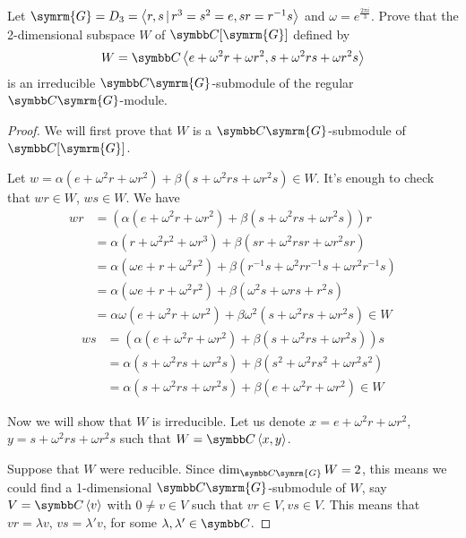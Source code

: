 \begin{exercise}
Let \(\symrm{G} = D_3 = \generatedby{r, s \vbar r^3 = s^2 = e, s r = r^{-1} s}\) and \(\omega = e^{\frac{2 \pi i}{3}}\). Prove that the 2-dimensional subspace \(W\) of \(\complex[\symrm{G}]\) defined by
\[
    W = \complex\generatedby{e + \omega^2 r + \omega r^2, s + \omega^2 r s + \omega r^2 s}
\]
is an irreducible \(\complex \symrm{G}\)-submodule of the regular \(\complex \symrm{G}\)-module.
\end{exercise}
\begin{proof}
We will first prove that \(W\) is a \(\complex \symrm{G}\)-submodule of \(\complex[\symrm{G}]\).

Let \(w = \alpha (e + \omega^2 r + \omega r^2) + \beta (s + \omega^2 r s + \omega r^2 s) \in W\). It's enough to check that \(w r \in W\), \(w s \in W\). We have
\begin{align*}
    wr &= (\alpha (e + \omega^2 r + \omega r^2) + \beta (s + \omega^2 r s + \omega r^2 s)) r \\
    &= \alpha (r + \omega^2 r^2 + \omega r^3) + \beta (s r + \omega^2 r s r + \omega r^2 s r) \\
    &= \alpha (\omega e + r + \omega^2 r^2) + \beta (r^{-1} s + \omega^2 r r^{-1} s + \omega r^2 r^{-1} s) \\
    &= \alpha (\omega e + r + \omega^2 r^2) + \beta (\omega^2 s + \omega rs + r^2 s) \\
    &= \alpha \omega (e + \omega^2 r + \omega r^2) + \beta \omega^2 (s + \omega^2 rs + \omega r^2 s) \in W
\end{align*}
\begin{align*}
    ws &= (\alpha (e + \omega^2 r + \omega r^2) + \beta (s + \omega^2 r s + \omega r^2 s))s \\
    &= \alpha (s + \omega^2 rs + \omega r^2 s) + \beta (s^2 + \omega^2 r s^2 + \omega r^2 s^2) \\
    &= \alpha (s + \omega^2 rs + \omega r^2 s) + \beta (e + \omega^2 r + \omega r^2) \in W
\end{align*}

Now we will show that \(W\) is irreducible. Let us denote \(x = e + \omega^2 r + \omega r^2\), \(y = s + \omega^2 r s + \omega r^2 s\) such that \(W = \complex\generatedby{x, y}\).

Suppose that \(W\) were reducible. Since \(\dim_{\complex \symrm{G}} W = 2\), this means we could find a 1-dimensional \(\complex \symrm{G}\)-submodule of \(W\), say \(V = \complex\generatedby{v}\) with \(0 \neq v \in V\) such that \(v r \in V, v s \in V\). This means that \(vr = \lambda v\), \(vs = \lambda' v\), for some \(\lambda, \lambda' \in \complex\).


\end{proof}
